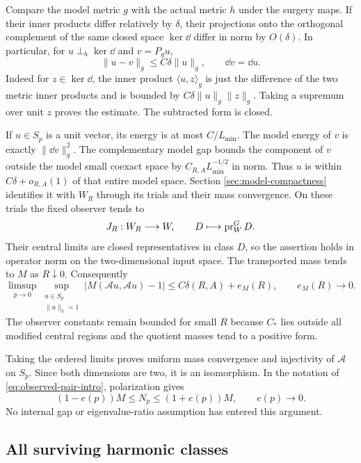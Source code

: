 Compare the model metric $g$ with the
actual metric $h$ under the surgery maps.
If their inner products differ relatively
by $\delta$, their projections onto the
orthogonal complement of the same closed
space $\ker\dd$ differ in norm by $O(\delta)$.
In particular, for $u\perp_h\ker\dd$
and $v=P_gu$,
\begin{equation}\label{eq:metric-coexact-projection}
 \|u-v\|_g\le C\delta\|u\|_g,\qquad
 \dd v=\dd u.
\end{equation}
Indeed for $z\in\ker\dd$, the inner product
$\langle u,z\rangle_g$ is just the difference
of the two metric inner products and is
bounded by $C\delta\|u\|_g\|z\|_g$.
Taking a supremum over unit $z$ proves
the estimate. The subtracted form is closed.

If $u\in S_p$ is a unit vector, its energy
is at most $C/L_{\min}$. The model energy
of $v$ is exactly $\|\dd v\|_g^2$.
The complementary model gap bounds the
component of $v$ outside the model small
coexact space by
$C_{R,A}L_{\min}^{-1/2}$ in norm.
Thus $u$ is within $C\delta+o_{R,A}(1)$
of that entire model space. Section
\ref{sec:model-compactness} identifies it
with $W_R$ through its trials and their
mass convergence. On these trials the
fixed observer tends to
\[
 J_R:W_R\longrightarrow W,\qquad
                   D\longmapsto\operatorname{pr}_W^G D.
\]
Their central limits are closed representatives
in class $D$, so the assertion holds in
operator norm on the two-dimensional input
space. The transported mass tends to $M$
as $R\downarrow0$. Consequently
\begin{equation}\label{eq:actual-cluster-mass}
 \limsup_{p\to0}
 \sup_{\substack{u\in S_p\\\|u\|_h=1}}
 |M(\mathcal Au,\mathcal Au)-1|
       \le C\delta(R,A)+e_M(R),\qquad e_M(R)\to0.
\end{equation}
The observer constants remain bounded for
small $R$ because $C_*$ lies outside all
modified central regions and the quotient
masses tend to a positive form.

Taking the ordered limits proves uniform
mass convergence and injectivity of
$\mathcal A$ on $S_p$. Since both dimensions
are two, it is an isomorphism. In the
notation of \eqref{eq:observed-pair-intro},
polarization gives
\begin{equation}\label{eq:actual-observed-mass}
 (1-e(p))M\le N_p\le(1+e(p))M,\qquad e(p)\to0.
\end{equation}
No internal gap or eigenvalue-ratio assumption
has entered this argument.

\subsection{All surviving harmonic classes}

